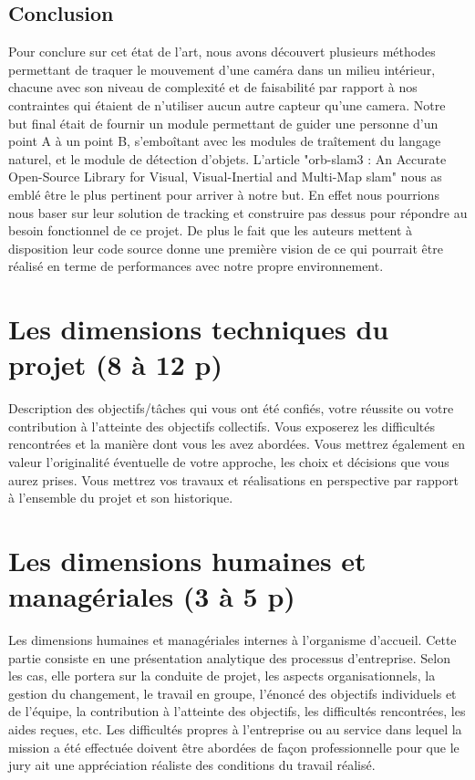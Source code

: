 \documentclass[11pt]{article}
\begin{document}
  \pagebreak

  \subsection{Conclusion}
  Pour conclure sur cet état de l'art, nous avons découvert plusieurs méthodes permettant de traquer le mouvement d'une caméra dans un
  milieu intérieur, chacune avec son niveau de complexité et de faisabilité par rapport à nos contraintes qui étaient de n'utiliser aucun
  autre capteur qu'une camera. Notre but final était de fournir un module permettant de guider une personne d'un point A à un point B, 
  s'emboîtant avec les modules de traîtement du langage naturel, et le module de détection d'objets. L'article "\acrshort{orb}-\acrshort{slam}3 : An Accurate 
  Open-Source Library for Visual, Visual-Inertial and Multi-Map \acrshort{slam}" nous as emblé être le plus pertinent pour arriver à notre but. 
  En effet nous pourrions nous baser sur leur solution de tracking et construire pas dessus pour répondre au besoin fonctionnel de ce projet.
  De plus le fait que les auteurs mettent à disposition leur code source donne une première vision de ce qui pourrait être réalisé en terme de 
  performances avec notre propre environnement.

  \pagebreak
  \section{Les dimensions techniques du projet (8 à 12 p)}
  Description des objectifs/tâches qui vous ont été confiés, votre réussite ou votre contribution à
  l’atteinte des objectifs collectifs. Vous exposerez les difficultés rencontrées et la manière dont vous
  les avez abordées. Vous mettrez également en valeur l’originalité éventuelle de votre approche, les
  choix et décisions que vous aurez prises. Vous mettrez vos travaux et réalisations en perspective par
  rapport à l’ensemble du projet et son historique.

  \pagebreak
  \section{Les dimensions humaines et managériales (3 à 5 p)}
  Les dimensions humaines et managériales internes à l’organisme d’accueil. Cette partie consiste en
  une présentation analytique des processus d’entreprise. Selon les cas, elle portera sur la conduite de
  projet, les aspects organisationnels, la gestion du changement, le travail en groupe, l’énoncé des
  objectifs individuels et de l’équipe, la contribution à l’atteinte des objectifs, les difficultés rencontrées,
  les aides reçues, etc. Les difficultés propres à l’entreprise ou au service dans lequel la mission a été
  effectuée doivent être abordées de façon professionnelle pour que le jury ait une appréciation réaliste
  des conditions du travail réalisé.  
\end{document}

